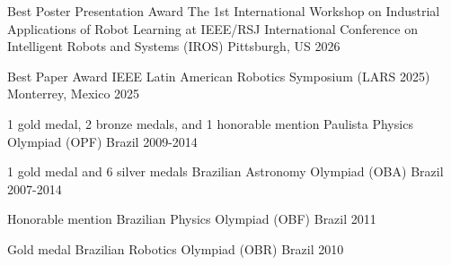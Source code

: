 \begin{cvhonors}

  \cvhonor
    {Best Poster Presentation Award} %
    {The 1st International Workshop on Industrial Applications of Robot Learning at IEEE/RSJ International Conference on Intelligent Robots and Systems (IROS)} %
    {Pittsburgh, US} %
    {2026} %

  \cvhonor
    {Best Paper Award} %
    {IEEE Latin American Robotics Symposium (LARS 2025)} %
    {Monterrey, Mexico} %
    {2025} %
    

  \cvhonor
    {1 gold medal, 2 bronze medals, and 1 honorable mention} %
    {Paulista Physics Olympiad (OPF)} %
    {Brazil} %
    {2009-2014} %
    
  \cvhonor
    {1 gold medal and 6 silver medals} %
    {Brazilian Astronomy Olympiad (OBA)} %
    {Brazil} %
    {2007-2014} %

  \cvhonor
    {Honorable mention} %
    {Brazilian Physics Olympiad (OBF)} %
    {Brazil} %
    {2011} %

  \cvhonor
    {Gold medal} %
    {Brazilian Robotics Olympiad (OBR)} %
    {Brazil} %
    {2010} %

\end{cvhonors}